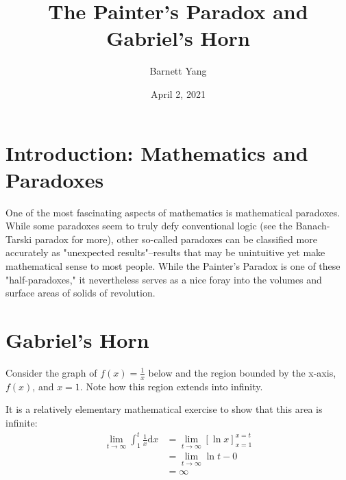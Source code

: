 \documentclass{article}[11pt]
\title{The Painter's Paradox and Gabriel's Horn}
\author{Barnett Yang}
\date{April 2, 2021}
\begin{document}
\maketitle
\section*{Introduction: Mathematics and Paradoxes}
One of the most fascinating aspects of mathematics is mathematical paradoxes. While some paradoxes seem to truly defy conventional logic (see the Banach-Tarski paradox for more), other so-called paradoxes can be classified more accurately as "unexpected results"--results that may be unintuitive yet make mathematical sense to most people. While the Painter's Paradox is one of these "half-paradoxes," it nevertheless serves as a nice foray into the volumes and surface areas of solids of revolution.

\section{Gabriel's Horn}
Consider the graph of $f(x) = \frac{1}{x}$ below and the region bounded by the x-axis, $f(x)$, and $x=1$. Note how this region extends into infinity.

\begin{center}
\end{center}

It is a relatively elementary mathematical exercise to show that this area is infinite:
\begin{align*}
\lim_{t \to \infty}\int_1^{t}\frac{1}{x}\textrm{d}{x} &= \lim_{t\to\infty}[\ln{x}]_{x=1}^{x=t} \\
&= \lim_{t\to\infty}{\ln{t}} - 0 \\
&= \infty
\end{align*}
\end{document}
